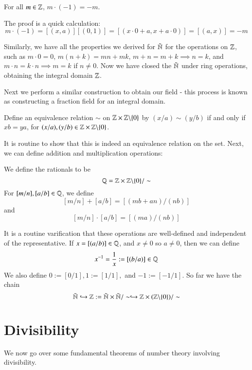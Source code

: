 \begin{prop}
    For all $m \in \mathbb Z$, $m \cdot (-1) = -m$.
\end{prop}
The proof is a quick calculation: \begin{equation*}
    m\cdot (-1) = [(x,a)][(0,1)] = [(x\cdot 0+a,x+a\cdot 0)] = [(a,x)] = -m
\end{equation*}

Similarly, we have all the properties we derived for $\tilde{\mathbb N}$ for the operations on $\mathbb Z$, such as $m\cdot 0 = 0$, $m(n+k) = mn+mk$, $m+n=m+k \implies n =k$, and $m\cdot n= k\cdot n\implies m=k$ if $n \neq 0$. Now we have closed the $\tilde{\mathbb N}$ under ring operations, obtaining the integral domain $\mathbb Z$.

Next we perform a similar construction to obtain our field - this process is known as constructing a fraction field for an integral domain.

\begin{defn}
    Define an equivalence relation $\sim$ on $\mathbb Z\times \mathbb Z\backslash\{0\}$ by $(x/a)\sim(y/b)$ if and only if $xb = ya$, for $(x/a),(y/b) \in \mathbb Z\times \mathbb Z\backslash\{0\}$.
\end{defn}

It is routine to show that this is indeed an equivalence relation on the set. Next, we can define addition and multiplication operations:

\begin{defn}
    We define the rationals to be \begin{equation*}
        \mathbb Q = \mathbb Z\times \mathbb Z\backslash\{0\}/\sim
    \end{equation*}
    For $[m/n],[a/b] \in \mathbb Q$, we define $$[m/n] + [a/b] = [(mb+an)/(nb)]$$ and $$[m/n]\cdot[a/b] = [(ma)/(nb)]$$
\end{defn}

It is a routine varification that these operations are well-defined and independent of the representative. If $x = [(a/b)] \in \mathbb Q$, and $x \neq 0$ so $a \neq 0$, then we can define $$x^{-1} = \frac{1}{x} := [(b/a)] \in \mathbb Q$$ We also define $0 := [0/1], 1 := [1/1],$ and $-1 := [-1/1]$. So far we have the chain $$\tilde{\mathbb N}\hookrightarrow \mathbb Z := \tilde{\mathbb N}\times \tilde{\mathbb N}/\sim \hookrightarrow \mathbb Z\times (\mathbb Z\backslash\{0\})/\sim$$

\section{Divisibility}

We now go over some fundamental theorems of number theory involving divisibility.

